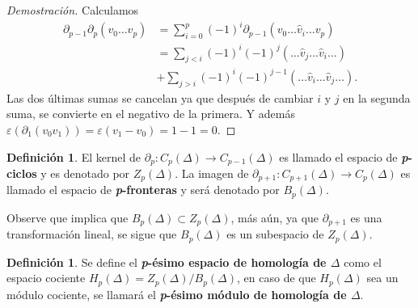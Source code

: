\documentclass[12pt]{book}
\theoremstyle{definition}
\newtheorem{definition}[theorem]{Definición}
\newcounter{in}
\newcounter{ini}
\begin{document}
\begin{proof}[Demostración]
  Calculamos
  \begin{align*}
    \partial_{p-1}\partial_{p}(v_{0}\ldots
    v_{p})&=\sum_{i=0}^{p}(-1)^{i}\partial_{p-1}(v_{0}\ldots \widehat v_{i}\ldots v_{p})\\
    &=\sum_{j<i}(-1)^{i}(-1)^{j}(\ldots \widehat v_{j} \ldots \widehat v_{i} \ldots)\\
    &+\sum_{j>i}(-1)^{i}(-1)^{j-1}(\ldots\widehat v_{i}\ldots \widehat
    v_{j}\ldots).
  \end{align*}
  Las dos últimas sumas se cancelan ya que después de cambiar $i$ y
  $j$ en la segunda suma, se convierte en el negativo de la primera. Y
  además
  $\varepsilon(\partial_{1}(v_{0}v_{1}))=\varepsilon(v_{1}-v_{0})=1-1=0$.
\end{proof}
\begin{definition}
  El kernel de $\partial_{p}:C_{p}(\Delta)\rightarrow C_{p-1}(\Delta)$
  es llamado el espacio de \textbf{\emph{p}-ciclos} y es denotado por
  $Z_{p}(\Delta)$. La imagen de
  $\partial_{p+1}:C_{p+1}(\Delta)\rightarrow C_{p}(\Delta)$ es llamado
  el espacio de \textbf{\emph{p}-fronteras} y será denotado por
  $B_{p}(\Delta)$.
 \end{definition}
 Observe que implica que $B_{p}(\Delta) \subset Z_{p}(\Delta)$, más
 aún, ya que $\partial_{p+1}$ es una transformación lineal, se sigue
 que $B_{p}(\Delta)$ es un subespacio de $Z_{p}(\Delta)$.
 \begin{definition}
   Se define el \textbf{\emph{p}-ésimo espacio de homología de
     $\Delta$} como el espacio cociente
   $H_{p}(\Delta)=Z_{p}(\Delta)/B_{p}(\Delta)$, en caso de que
   $H_{p}(\Delta)$ sea un módulo cociente, se llamará el
   \textbf{\emph{p}-ésimo módulo de homología de $\Delta$}.
\end{definition}
\end{document}
